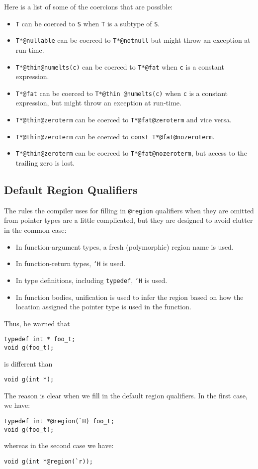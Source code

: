 Here is a list of some of the coercions that are possible:
\begin{itemize}
\item \texttt{T} can be coerced to \texttt{S} when \texttt{T} is a subtype of
\texttt{S}.
\item \texttt{T*@nullable} 
can be coerced to \texttt{T*@notnull} but might
throw an exception at run-time.
\item \texttt{T*@thin@numelts(c)} can be coerced to \texttt{T*@fat}
when \texttt{c} is a constant expression.
\item \texttt{T*@fat} can be coerced to \texttt{T*@thin @numelts(c)} 
when \texttt{c} is a constant expression, but might throw an exception
at run-time.
\item \texttt{T*@thin@zeroterm} 
can be coerced to \texttt{T*@fat@zeroterm}
and vice versa.  
\item \texttt{T*@thin@zeroterm} can be coerced to \texttt{const T*@fat@nozeroterm}.  
\item \texttt{T*@thin@zeroterm} can be coerced to \texttt{T*@fat@nozeroterm}, but access to the trailing zero is lost.  
\end{itemize}

\subsection{Default Region Qualifiers}

The rules the compiler uses for filling in \texttt{@region} qualifiers
when they are omitted from pointer types are a little complicated, but
they are designed to avoid clutter in the common case:
\begin{itemize}
\item In function-argument types, a fresh (polymorphic) region name is used.
\item In function-return types, \texttt{`H} is used.
\item In type definitions, including \texttt{typedef}, \texttt{`H} is used.
\item In function bodies, unification is used to infer the region
based on how the location assigned the pointer type is used in the
function.
\end{itemize}
Thus, be warned that 
\begin{verbatim}
typedef int * foo_t;
void g(foo_t);
\end{verbatim}
is different than
\begin{verbatim}
void g(int *);
\end{verbatim}
The reason is clear when we fill in the default region qualifiers.
In the first case, we have:
\begin{verbatim}
typedef int *@region(`H) foo_t;
void g(foo_t);
\end{verbatim}
whereas in the second case we have:
\begin{verbatim}
void g(int *@region(`r));
\end{verbatim}

